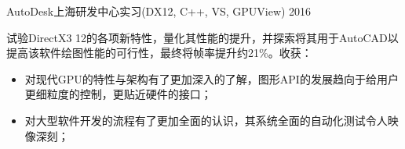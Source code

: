 \documentclass[]{friggeri-cv_cn} %
\begin{document}
\begin{entrylist}
\entry
  {AutoDesk上海研发中心实习(DX12, C++, VS, GPUView)}
{2016}
{试验DirectX3 12的各项新特性，量化其性能的提升，并探索将其用于AutoCAD以提高该软件绘图性能的可行性，最终将帧率提升约21\%。收获：
\begin{itemize}
    \item 对现代GPU的特性与架构有了更加深入的了解，图形API的发展趋向于给用户更细粒度的控制，更贴近硬件的接口；
    \item 对大型软件开发的流程有了更加全面的认识，其系统全面的自动化测试令人映像深刻；
\end{itemize}}

%



\end{entrylist}
\end{document}
